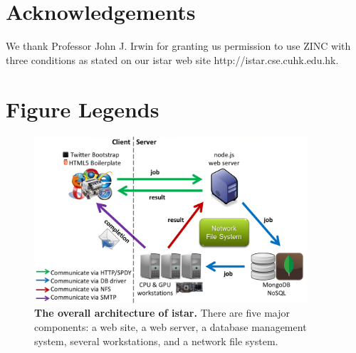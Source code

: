\documentclass[10pt]{article}
\begin{document}
\section*{Acknowledgements}
We thank Professor John J. Irwin for granting us permission to use ZINC \cite{532,1178} with three conditions as stated on our istar web site http://istar.cse.cuhk.edu.hk.



\section*{Figure Legends}

\begin{figure}[!ht]
\begin{center}
\includegraphics[width=4in]{Architecture.eps}
\end{center}
\caption{
{\bf The overall architecture of istar.} There are five major components: a web site, a web server, a database management system, several workstations, and a network file system.
}
\label{Architecture}
\end{figure}
\end{document}

